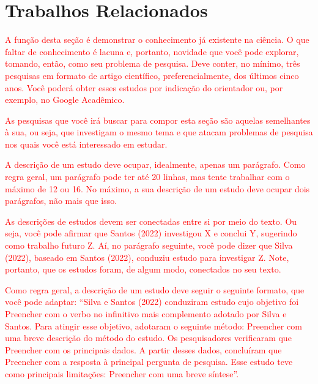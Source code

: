 \section{Trabalhos Relacionados}
\label{sec:trabalhos-re}



\textcolor{red}{A função desta seção é demonstrar o conhecimento já existente na ciência. O que faltar de conhecimento é lacuna e, portanto, novidade que você pode explorar, tomando, então, como seu problema de pesquisa. Deve conter, no mínimo, três pesquisas em formato de artigo científico, preferencialmente, dos últimos cinco anos. Você poderá obter esses estudos por indicação do orientador ou, por exemplo, no Google Acadêmico.}

\textcolor{red}{As pesquisas que você irá buscar para compor esta seção são aquelas semelhantes à sua, ou seja, que investigam o mesmo tema e que atacam problemas de pesquisa nos quais você está interessado em estudar.}

\textcolor{red}{A descrição de um estudo deve ocupar, idealmente, apenas um parágrafo. Como regra geral, um parágrafo pode ter até 20 linhas, mas tente trabalhar com o máximo de 12 ou 16. No máximo, a sua descrição de um estudo deve ocupar dois parágrafos, não mais que isso.}

\textcolor{red}{As descrições de estudos devem ser conectadas entre si por meio do texto. Ou seja, você pode afirmar que Santos (2022) investigou X e conclui Y, sugerindo como trabalho futuro Z. Aí, no parágrafo seguinte, você pode dizer que Silva (2022), baseado em Santos (2022), conduziu estudo para investigar Z. Note, portanto, que os estudos foram, de algum modo, conectados no seu texto.}

\textcolor{red}{Como regra geral, a descrição de um estudo deve seguir o seguinte formato, que você pode adaptar: “Silva e Santos (2022) conduziram estudo cujo objetivo foi {Preencher com o verbo no infinitivo mais complemento adotado por Silva e Santos}. Para atingir esse objetivo, adotaram o seguinte método: {Preencher com uma breve descrição do método do estudo}. Os pesquisadores verificaram que {Preencher com os principais dados}. A partir desses dados, concluíram que {Preencher com a resposta à principal pergunta de pesquisa}. Esse estudo teve como principais limitações: {Preencher com uma breve síntese}”.}

